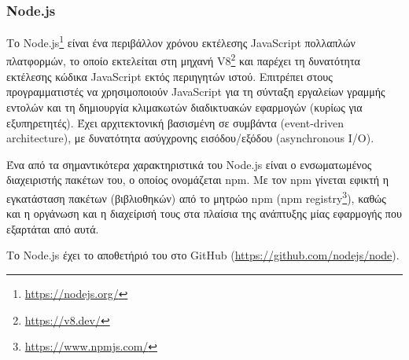 \subsubsection{Node.js} \label{subsection:4-2-1-1-node.js}


Το Node.js\footnote{\url{https://nodejs.org/}} είναι ένα περιβάλλον χρόνου εκτέλεσης JavaScript πολλαπλών πλατφορμών, το οποίο εκτελείται στη μηχανή V8\footnote{\url{https://v8.dev/}} και παρέχει τη δυνατότητα εκτέλεσης κώδικα JavaScript εκτός περιηγητών ιστού. Επιτρέπει στους προγραμματιστές να χρησιμοποιούν JavaScript για τη σύνταξη εργαλείων γραμμής εντολών και τη δημιουργία κλιμακωτών διαδικτυακών εφαρμογών (κυρίως για εξυπηρετητές). Έχει αρχιτεκτονική βασισμένη σε συμβάντα (event-driven architecture), με δυνατότητα ασύγχρονης εισόδου/εξόδου (asynchronous I/O).\cite{4.2-node.js}

Ένα από τα σημαντικότερα χαρακτηριστικά του Node.js είναι ο ενσωματωμένος διαχειριστής πακέτων του, ο οποίος ονομάζεται npm. Με τον npm γίνεται εφικτή η εγκατάσταση πακέτων (βιβλιοθηκών) από το μητρώο npm (npm registry\footnote{\url{https://www.npmjs.com/}}), καθώς και η οργάνωση και η διαχείρισή τους στα πλαίσια της ανάπτυξης μίας εφαρμογής που εξαρτάται από αυτά.

Το Node.js έχει το αποθετήριό του στο GitHub (\url{https://github.com/nodejs/node}).